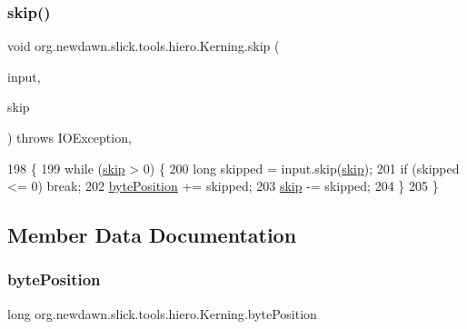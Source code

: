 \subsubsection{\texorpdfstring{skip()}{skip()}}
{\footnotesize\ttfamily void org.\+newdawn.\+slick.\+tools.\+hiero.\+Kerning.\+skip (\begin{DoxyParamCaption}\item[{Input\+Stream}]{input,  }\item[{long}]{skip }\end{DoxyParamCaption}) throws I\+O\+Exception\hspace{0.3cm}{\ttfamily [inline]}, {\ttfamily [private]}}


\begin{DoxyCode}
198                                                                         \{
199         \textcolor{keywordflow}{while} (\mbox{\hyperlink{classorg_1_1newdawn_1_1slick_1_1tools_1_1hiero_1_1_kerning_afa04157519725497f528b5bc175f1abb}{skip}} > 0) \{
200             \textcolor{keywordtype}{long} skipped = input.skip(\mbox{\hyperlink{classorg_1_1newdawn_1_1slick_1_1tools_1_1hiero_1_1_kerning_afa04157519725497f528b5bc175f1abb}{skip}});
201             \textcolor{keywordflow}{if} (skipped <= 0) \textcolor{keywordflow}{break};
202             \mbox{\hyperlink{classorg_1_1newdawn_1_1slick_1_1tools_1_1hiero_1_1_kerning_a6c58cfffdf2d5619a257504e489deb1b}{bytePosition}} += skipped;
203             \mbox{\hyperlink{classorg_1_1newdawn_1_1slick_1_1tools_1_1hiero_1_1_kerning_afa04157519725497f528b5bc175f1abb}{skip}} -= skipped;
204         \}
205     \}
\end{DoxyCode}


\subsection{Member Data Documentation}
\mbox{\label{classorg_1_1newdawn_1_1slick_1_1tools_1_1hiero_1_1_kerning_a6c58cfffdf2d5619a257504e489deb1b}} 
\subsubsection{\texorpdfstring{byte\+Position}{bytePosition}}
{\footnotesize\ttfamily long org.\+newdawn.\+slick.\+tools.\+hiero.\+Kerning.\+byte\+Position\hspace{0.3cm}{\ttfamily [private]}}

